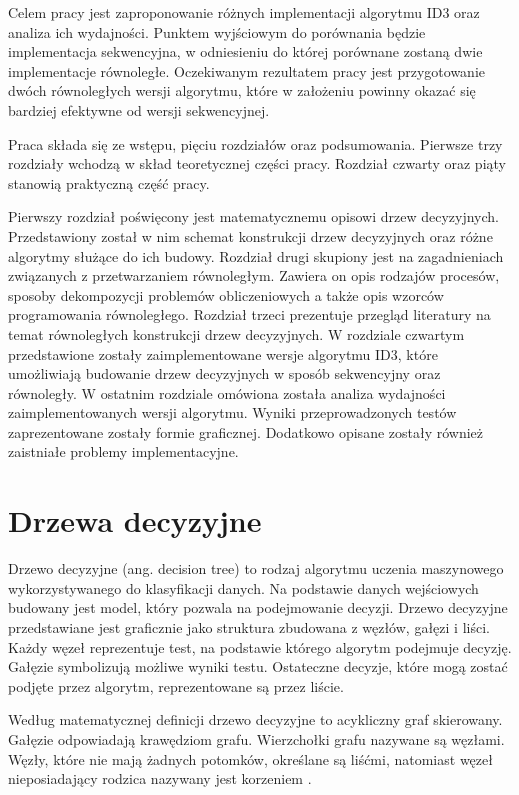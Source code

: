 \documentclass[12pt]{article}
\begin{document}
Celem pracy jest zaproponowanie różnych implementacji algorytmu ID3 oraz analiza ich wydajności.
Punktem wyjściowym do porównania będzie implementacja sekwencyjna, w odniesieniu do której porównane zostaną dwie implementacje równoległe.
Oczekiwanym rezultatem pracy jest przygotowanie dwóch równoległych wersji algorytmu, które w założeniu powinny okazać się bardziej
efektywne od wersji sekwencyjnej.

Praca składa się ze wstępu, pięciu rozdziałów oraz podsumowania. Pierwsze trzy
rozdziały wchodzą w skład teoretycznej części pracy. Rozdział czwarty oraz piąty
stanowią praktyczną część pracy.

Pierwszy rozdział poświęcony jest matematycznemu opisowi drzew decyzyjnych.
Przedstawiony został w nim schemat konstrukcji drzew decyzyjnych oraz różne algorytmy służące
do ich budowy. Rozdział drugi skupiony jest na zagadnieniach związanych z przetwarzaniem równoległym.
Zawiera on opis rodzajów procesów, sposoby dekompozycji problemów obliczeniowych a także
opis wzorców programowania równoległego. Rozdział trzeci prezentuje przegląd literatury 
na temat równoległych konstrukcji drzew decyzyjnych. W rozdziale czwartym przedstawione
zostały zaimplementowane wersje algorytmu ID3, które umożliwiają budowanie drzew decyzyjnych w sposób
sekwencyjny oraz równoległy. W ostatnim rozdziale omówiona została analiza wydajności zaimplementowanych
wersji algorytmu. Wyniki przeprowadzonych testów zaprezentowane zostały formie graficznej.
Dodatkowo opisane zostały również zaistniałe problemy implementacyjne. 
\newpage

\section{Drzewa decyzyjne}
Drzewo decyzyjne (ang. decision tree) to rodzaj algorytmu uczenia maszynowego
wykorzystywanego do klasyfikacji danych. Na podstawie danych wejściowych budowany jest model,
który pozwala na podejmowanie decyzji. Drzewo decyzyjne przedstawiane jest graficznie jako
struktura zbudowana z węzłów, gałęzi i liści. Każdy węzeł reprezentuje test, na podstawie
którego algorytm podejmuje decyzję. Gałęzie symbolizują możliwe wyniki testu. Ostateczne
decyzje, które mogą zostać podjęte przez algorytm, reprezentowane są przez liście.

Według matematycznej definicji drzewo decyzyjne to acykliczny graf skierowany.
Gałęzie odpowiadają krawędziom grafu. Wierzchołki grafu nazywane są węzłami. Węzły, które
nie mają żadnych potomków, określane są liśćmi, natomiast węzeł nieposiadający rodzica
nazywany jest korzeniem \cite{algorytmy-do-konstruowania-drzew-decyzyjnych}.
\end{document}
